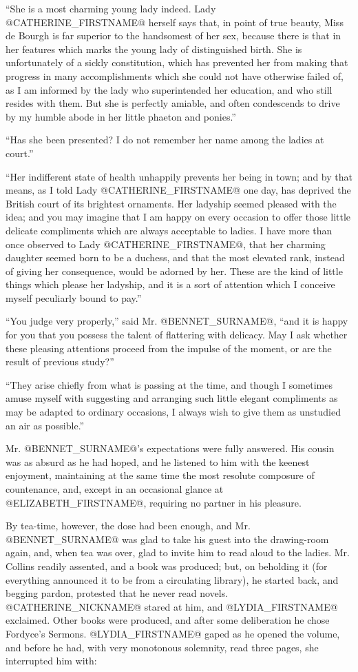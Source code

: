 ``She is a most charming young lady indeed. Lady @CATHERINE_FIRSTNAME@ herself says
that, in point of true beauty, Miss de Bourgh is far superior to the
handsomest of her sex, because there is that in her features which marks
the young lady of distinguished birth. She is unfortunately of a sickly
constitution, which has prevented her from making that progress in many
accomplishments which she could not have otherwise failed of, as I am
informed by the lady who superintended her education, and who still
resides with them. But she is perfectly amiable, and often condescends
to drive by my humble abode in her little phaeton and ponies.''

``Has she been presented? I do not remember her name among the ladies at
court.''

``Her indifferent state of health unhappily prevents her being in town;
and by that means, as I told Lady @CATHERINE_FIRSTNAME@ one day, has deprived the
British court of its brightest ornaments. Her ladyship seemed pleased
with the idea; and you may imagine that I am happy on every occasion to
offer those little delicate compliments which are always acceptable
to ladies. I have more than once observed to Lady @CATHERINE_FIRSTNAME@, that
her charming daughter seemed born to be a duchess, and that the most
elevated rank, instead of giving her consequence, would be adorned by
her. These are the kind of little things which please her ladyship, and
it is a sort of attention which I conceive myself peculiarly bound to
pay.''

``You judge very properly,'' said Mr. @BENNET_SURNAME@, ``and it is happy for you
that you possess the talent of flattering with delicacy. May I ask
whether these pleasing attentions proceed from the impulse of the
moment, or are the result of previous study?''

``They arise chiefly from what is passing at the time, and though I
sometimes amuse myself with suggesting and arranging such little elegant
compliments as may be adapted to ordinary occasions, I always wish to
give them as unstudied an air as possible.''

Mr. @BENNET_SURNAME@'s expectations were fully answered. His cousin was as absurd
as he had hoped, and he listened to him with the keenest enjoyment,
maintaining at the same time the most resolute composure of countenance,
and, except in an occasional glance at @ELIZABETH_FIRSTNAME@, requiring no partner
in his pleasure.

By tea-time, however, the dose had been enough, and Mr. @BENNET_SURNAME@ was glad
to take his guest into the drawing-room again, and, when tea was over,
glad to invite him to read aloud to the ladies. Mr. Collins readily
assented, and a book was produced; but, on beholding it (for everything
announced it to be from a circulating library), he started back, and
begging pardon, protested that he never read novels. @CATHERINE_NICKNAME@ stared at
him, and @LYDIA_FIRSTNAME@ exclaimed. Other books were produced, and after some
deliberation he chose Fordyce's Sermons. @LYDIA_FIRSTNAME@ gaped as he opened the
volume, and before he had, with very monotonous solemnity, read three
pages, she interrupted him with:

